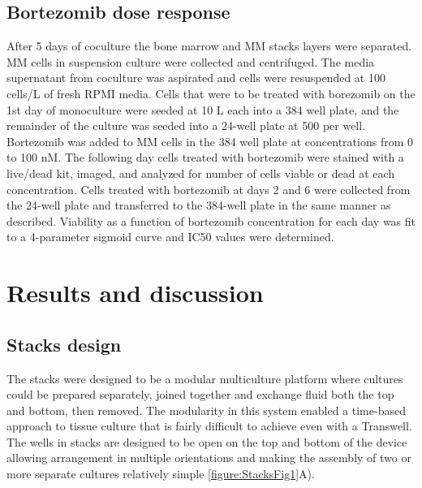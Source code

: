 \subsection{Bortezomib dose response}
After 5 days of coculture the bone marrow and MM stacks layers were separated. MM cells in suspension culture were collected and centrifuged. The media supernatant from coculture was aspirated and cells were resuspended at 100 cells/\textmu L of fresh RPMI media. Cells that were to be treated with borezomib on the 1st day of monoculture were seeded at 10 \textmu L each into a 384 well plate, and the remainder of the culture was seeded into a 24-well plate at 500 \textmu per well. Bortezomib was added to MM cells in the 384 well plate at concentrations from 0 to 100 nM. The following day cells treated with bortezomib were stained with a live/dead kit, imaged, and analyzed for number of cells viable or dead at each concentration. Cells treated with bortezomib at days 2 and 6 were collected from the 24-well plate and transferred to the 384-well plate in the same manner as described. Viability as a function of bortezomib concentration for each day was fit to a 4-parameter sigmoid curve and IC50 values were determined. 


\section{Results and discussion}

\subsection{Stacks design}

The stacks were designed to be a modular multiculture platform where cultures could be prepared separately, joined together and exchange fluid both the top and bottom, then removed. The modularity in this system enabled a time-based approach to tissue culture that is fairly difficult to achieve even with a Transwell. The wells in stacks are designed to be open on the top and bottom of the device allowing arrangement in multiple orientations and making the assembly of two or more separate cultures relatively simple \ref{figure:StacksFig1}A).

